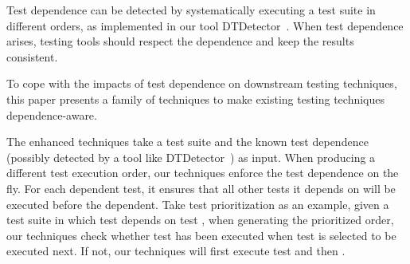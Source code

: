Test dependence can be detected by systematically
executing a test suite in different orders, as implemented
in our tool DTDetector~\cite{testdependence}.
When test dependence arises, testing tools should
respect the dependence and keep the results consistent. 

To cope with the impacts of test dependence on downstream
testing techniques, this paper presents a family of
techniques to make existing testing techniques dependence-aware.


The enhanced techniques take a test suite and the known
test dependence (possibly detected by a tool like DTDetector~\cite{testdependence}) as input. When producing a different test
execution order, our techniques enforce the test dependence
on the fly. For each dependent test, it ensures
that all other tests it depends on will be executed
before the dependent. Take test prioritization
as an example, given
a test suite in which test  depends on test ,
when generating the prioritized order, our techniques check
whether test  has been executed when test 
is selected to be executed next. If not, our techniques
will first execute test  and then .



